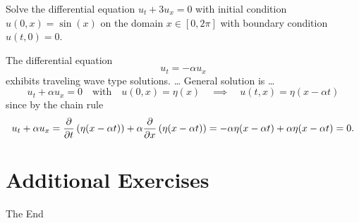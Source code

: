 \begin{problem}
    Solve the differential equation $u_t + 3u_x=0$ with initial condition $u(0,x) = \sin(x)$
    on the domain $x \in [0,2\pi]$ with boundary condition $u(t,0) = 0$.
\end{problem}
\solution{
    \[ u(t,x) = \sin(x-3t) \]
}

The differential equation
\[ u_{t} = -\alpha u_{x} \]
exhibits traveling wave type solutions.
\ldots
General solution is \ldots
\[ u_t + \alpha u_x = 0 \quad \text{with} \quad u(0,x) = \eta(x) \quad \implies \quad
    u(t,x) = \eta(x-\alpha t) \]
since by the chain rule 
\[ u_t + \alpha u_x = \frac{\partial  }{\partial t} \left( \eta(x-\alpha t) \right) + \alpha \frac{\partial  }{\partial x} \left(
    \eta(x-\alpha t) \right)=
    -\alpha \eta(x-\alpha t) + \alpha \eta(x-\alpha t) = 0. \]

\newpage\section{Additional Exercises}

\newpage
\begin{center}
    {\LARGE The End}
\end{center}
\newpage



